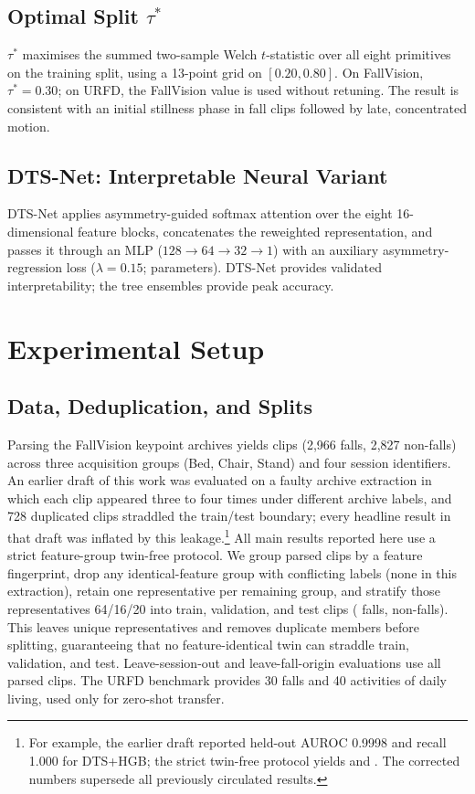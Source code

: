 \documentclass[letterpaper]{article}
\begin{document}
\subsection{Optimal Split $\tau^*$}
$\tau^*$ maximises the summed two-sample Welch $t$-statistic over all eight primitives on the training split, using a 13-point grid on $[0.20, 0.80]$. On FallVision, $\tau^* = 0.30$; on URFD, the FallVision value is used without retuning. The result is consistent with an initial stillness phase in fall clips followed by late, concentrated motion.

\subsection{DTS-Net: Interpretable Neural Variant}
DTS-Net applies asymmetry-guided softmax attention over the eight 16-dimensional feature blocks, concatenates the reweighted representation, and passes it through an MLP ($128 \to 64 \to 32 \to 1$) with an auxiliary asymmetry-regression loss ($\lambda = 0.15$; \dtsnetparams{} parameters). DTS-Net provides validated interpretability; the tree ensembles provide peak accuracy.

\section{Experimental Setup}

\subsection{Data, Deduplication, and Splits}
Parsing the FallVision keypoint archives yields \fvparsed{} clips (2{,}966 falls, 2{,}827 non-falls) across three acquisition groups (Bed, Chair, Stand) and four session identifiers. An earlier draft of this work was evaluated on a faulty archive extraction in which each clip appeared three to four times under different archive labels, and 728 duplicated clips straddled the train/test boundary; every headline result in that draft was inflated by this leakage.\footnote{For example, the earlier draft reported held-out AUROC 0.9998 and recall 1.000 for DTS+HGB; the strict twin-free protocol yields \DTSHGBauroc{} and \DTSHGBrec. The corrected numbers supersede all previously circulated results.} All main results reported here use a strict feature-group twin-free protocol. We group parsed clips by a feature fingerprint, drop any identical-feature group with conflicting labels (none in this extraction), retain one representative per remaining group, and stratify those representatives 64/16/20 into \trainn{} train, \valn{} validation, and \testn{} test clips (\testfalls{} falls, \testnonfalls{} non-falls). This leaves \fvunique{} unique representatives and removes \fvdupsremoved{} duplicate members before splitting, guaranteeing that no feature-identical twin can straddle train, validation, and test. Leave-session-out and leave-fall-origin evaluations use all \fvparsed{} parsed clips. The URFD benchmark \citep{kwolek2014} provides 30 falls and 40 activities of daily living, used only for zero-shot transfer.
\end{document}
